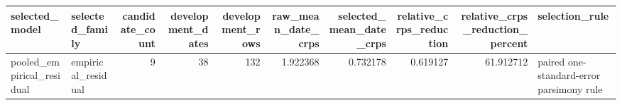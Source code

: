 \begin{tabular}{llrrrrrrrl}
\toprule
selected\_model & selected\_family & candidate\_count & development\_dates & development\_rows & raw\_mean\_date\_crps & selected\_mean\_date\_crps & relative\_crps\_reduction & relative\_crps\_reduction\_percent & selection\_rule \\
\midrule
pooled\_empirical\_residual & empirical\_residual & 9 & 38 & 132 & 1.922368 & 0.732178 & 0.619127 & 61.912712 & paired one-standard-error parsimony rule \\
\bottomrule
\end{tabular}
